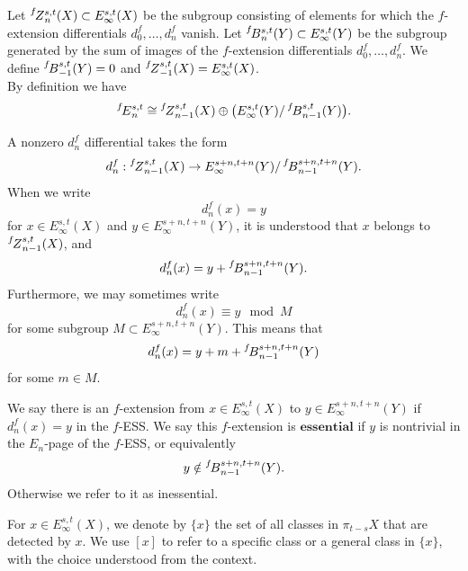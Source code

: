 \documentclass{amsart}
\numberwithin{equation}{section}
\newcommand{\ESS}[1]{\prescript{#1\!}{}{E}}
\newcommand{\ZESS}[1]{\prescript{#1\!}{}{Z}}
\newcommand{\BESS}[1]{\prescript{#1\!}{}{B}}
\begin{document}
\begin{notation}\label{nota:6fb333a2}
    Let $\ZESS{f}^{s,t}_n(X)\subset E^{s,t}_\infty(X)$ be the subgroup consisting of elements for which the $f$-extension differentials $d^f_0,\dots,d^f_n$ vanish.
    Let $\BESS{f}^{s,t}_n(Y)\subset E^{s,t}_\infty(Y)$ be the subgroup generated by the sum of images of the $f$-extension differentials $d^f_0,\dots,d^f_n$. We define $\BESS{f}^{s,t}_{-1}(Y)=0$ and $\ZESS{f}^{s,t}_{-1}(X)=E^{s,t}_\infty(X)$.\\
    
    By definition we have
    $$\ESS{f}^{s,t}_n\iso \ZESS{f}^{s,t}_{n-1}(X)\oplus \big(E^{s,t}_\infty(Y)/\BESS{f}^{s,t}_{n-1}(Y)\big).$$
    
    A nonzero $d^f_n$ differential takes the form
    $$d^f_n: \ZESS{f}^{s,t}_{n-1}(X)\to E^{s+n,t+n}_\infty(Y)/\BESS{f}^{s+n,t+n}_{n-1}(Y).$$
     When we write 
    $$d^f_n(x)=y$$
    for $x\in E_\infty^{s,t}(X)$ and $y\in E_\infty^{s+n,t+n}(Y)$, it is understood that $x$ belongs to $\ZESS{f}^{s,t}_{n-1}(X)$, and 
    $$d^f_n(x)=y+\BESS{f}^{s+n,t+n}_{n-1}(Y).$$
    Furthermore, we may sometimes write
    $$d^f_n(x)\equiv y\mod M$$
    for some subgroup $M\subset E_\infty^{s+n,t+n}(Y)$. This means that 
    $$d^f_n(x)=y+m+\BESS{f}^{s+n,t+n}_{n-1}(Y)$$
    for some $m\in M$.
\end{notation}

\begin{definition}\label{def:768fba8a}
    We say there is an $f$-extension from $x\in E_\infty^{s,t}(X)$ to $y\in E_\infty^{s+n,t+n}(Y)$ if $d_n^{f}(x)=y$ in the $f$-ESS. We say this $f$-extension is $\textbf{essential}$ if $y$ is nontrivial in the $E_n$-page of the $f$-ESS, or equivalently $$y\notin \BESS{f}^{s+n,t+n}_{n-1}(Y).$$
    Otherwise we refer to it as inessential.
\end{definition}

\begin{notation}
    For $x\in E_\infty^{s,t}(X)$, we denote by $\{x\}$  the set of all classes in $\pi_{t-s}X$ that are detected by $x$. We use $[x]$ to refer to a specific class or a general class in $\{x\}$, with the choice understood from the context.
\end{notation}
\end{document}
